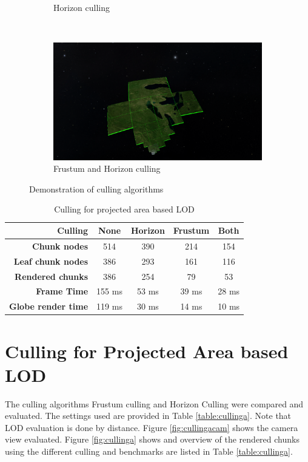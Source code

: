 \begin{figure}[h]
\begin{subfigure}[bt]{0.48\textwidth}
        \caption{Horizon culling}
    \end{subfigure}
    ~
    \begin{subfigure}[bt]{0.48\textwidth}
        \includegraphics[width=\textwidth]{figures/results/culling/dhf.png}
        \caption{Frustum and Horizon culling}
    \end{subfigure}
    \caption{Demonstration of culling algorithms}
    \label{fig:cullingd}
\end{figure}

\begin{table}[h]
\centering
\caption[]{Culling for projected area based LOD}
  \label{table:cullingd}
  \begin{tabular}{| r | c c c c |}
    \hline
      \textbf{Culling}            & \textbf{None}  & \textbf{Horizon} & \textbf{Frustum}  & \textbf{Both} \\ \hline
      \textbf{Chunk nodes}        & 514            & 390              & 214               & 154 \\ 
      \textbf{Leaf chunk nodes}   & 386            & 293              & 161               & 116 \\ 
      \textbf{Rendered chunks}    & 386            & 254              & 79                & 53 \\
      \textbf{Frame Time}         & 155 ms         & 53 ms            & 39 ms             & 28 ms \\
      \textbf{Globe render time}  & 119 ms         & 30 ms            & 14 ms             & 10 ms \\
    \hline
  \end{tabular}
\end{table}

\clearpage
\section{Culling for Projected Area based LOD}
\FloatBarrier
The culling algorithms Frustum culling and Horizon Culling were compared and evaluated. The settings used are provided in Table \ref{table:cullinga}. Note that LOD evaluation is done by distance. Figure \ref{fig:cullingacam} shows the camera view evaluated. Figure \ref{fig:cullinga} shows and overview of the rendered chunks using the different culling and benchmarks are listed in Table \ref{table:cullinga}.

